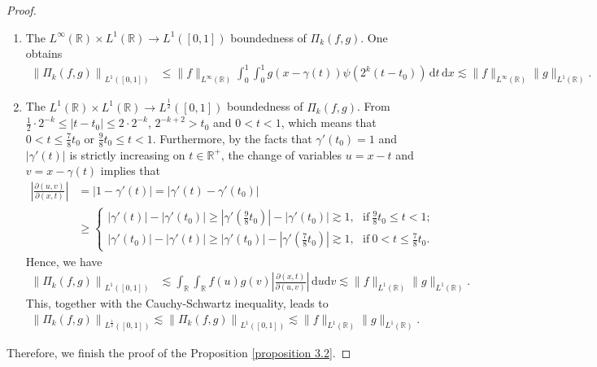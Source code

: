 \documentclass[11pt, twoside, leqno]{article}
\def\gs{\gtrsim}
\theoremstyle{definition}
\numberwithin{equation}{section}
\begin{document}
\begin{proof}
\begin{enumerate}
\begin{enumerate}
  \item[$\circ$] The $L^{\infty}(\mathbb{R})\times L^1(\mathbb{R}) \rightarrow L^1([0, 1])$ boundedness of $\Pi_k(f,g)$. One obtains
  \begin{align*}
\left\|\Pi_k(f,g)\right\|_{L^{1}([0, 1])}&\leq \|f\|_{L^{\infty}(\mathbb{R})}\int_{0}^{1}\int_{0}^{1}g(x-\gamma(t))\psi\left(2^{k}(t-t_{0})\right)\,\textrm{d}t\,\textrm{d}x \lesssim \|f\|_{L^{\infty}(\mathbb{R})}\|g\|_{L^{1}(\mathbb{R})}.
\end{align*}

  \item[$\circ$] The $L^1(\mathbb{R})\times L^1(\mathbb{R}) \rightarrow L^{\frac{1}{2}}([0, 1])$ boundedness of $\Pi_k(f,g)$. From ${\frac{1}{2}}\cdot2^{-k}\leq|t-t_0|\leq2\cdot2^{-k}$, $2^{-k+2}> t_0$ and $0<t<1$, which means that $0<t\leq \frac{7}{8}t_0$ or $ \frac{9}{8}t_0\leq t<1$. Furthermore, by the facts that $\gamma'(t_0)=1$ and $|\gamma'(t)|$ is strictly increasing on $t\in\mathbb{R}^+$, the change of variables $u=x-t$ and $v=x-\gamma(t)$ implies that
     \begin{align*}
     \left|{\frac{\partial(u,v)}{\partial(x,t)}}\right|&=|1-\gamma'(t)|=|\gamma'(t)-\gamma'(t_{0})|\\
     &\geq
\begin{cases}|\gamma'(t)|-|\gamma'(t_{0})|\geq \left|\gamma'\left(\frac{9}{8}t_0\right)\right|-\left|\gamma'(t_{0})\right|\gs 1, ~~~\textrm{if} ~\frac{9}{8}t_0\leq t<1;\\
|\gamma'(t_{0})|-|\gamma'(t)|\geq \left|\gamma'(t_{0})\right|-\left|\gamma'\left(\frac{7}{8}t_0\right)\right|\gs 1, ~~~\textrm{if} ~0<t\leq \frac{7}{8}t_0.
\end{cases}
\end{align*}
Hence, we have
  \begin{align*}
\left\|\Pi_k(f,g)\right\|_{L^{1}([0, 1])}&\lesssim  \int_\mathbb{R}\int_\mathbb{R} f(u)g(v)\left|{\frac{\partial(x,t)}{\partial(u,v)}}\right|\,\textrm{d}u\textrm{d}v\lesssim  \|f\|_{L^{1}(\mathbb{R})}\|g\|_{L^{1}(\mathbb{R})}.
\end{align*}
This, together with the Cauchy-Schwartz inequality, leads to
  \begin{align*}
\left\|\Pi_k(f,g)\right\|_{L^{\frac{1}{2}}([0, 1])}\lesssim\left\|\Pi_k(f,g)\right\|_{L^{1}([0, 1])}\lesssim \|f\|_{L^{1}(\mathbb{R})}\|g\|_{L^{1}(\mathbb{R})}.
\end{align*}
\end{enumerate}
\end{enumerate}

Therefore, we finish the proof of the Proposition \ref{proposition 3.2}.
\end{proof}
\end{document}
